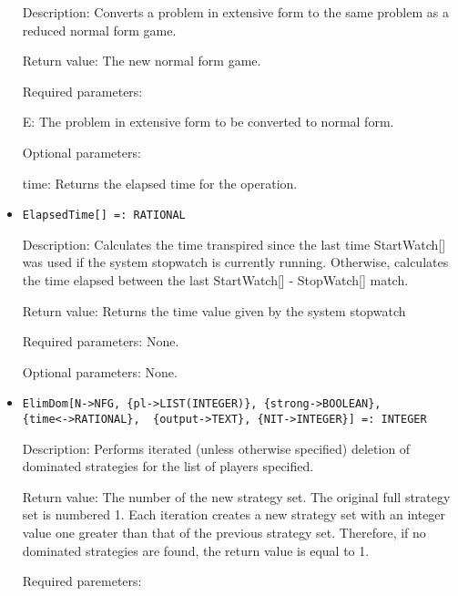 \begin{itemize}
\bd
\item
[Description:] Converts a problem in extensive form to the same
problem as a reduced normal form game.
\item
[Return value:] The new normal form game.
\item
[Required parameters:]\hfil\null
	
\bd
\item
[E:] The problem in extensive form to be converted to normal form.
\ed

\item
[Optional parameters:]\hfil\null
	
\bd
\item
[time:] Returns the elapsed time for the operation.
\ed
\ed

\item

\protect \large \begin{verbatim}
ElapsedTime[] =: RATIONAL
\end{verbatim}\normalsize

\bd
\item
[Description:] Calculates the time transpired since the last time
StartWatch[] was used if the system stopwatch is currently running.
Otherwise, calculates the time elapsed between the last StartWatch[] -
StopWatch[] match.
\item
[Return value:] Returns the time value given by the system stopwatch
\item
[Required parameters:] None.
\item   
[Optional parameters:] None.
\ed

\item
\protect \large \begin{verbatim}
ElimDom[N->NFG, {pl->LIST(INTEGER)}, {strong->BOOLEAN},
{time<->RATIONAL}, 	{output->TEXT}, {NIT->INTEGER}] =: INTEGER
\end{verbatim}
\normalsize

\bd
\item
[Description:] Performs iterated (unless otherwise specified) deletion
of dominated strategies for the list of players specified.
\item  
[Return value:] The number of the new strategy set.  The original full
strategy set is numbered 1.  Each iteration creates a new strategy set
with an integer value one greater than that of the previous strategy
set.  Therefore, if no dominated strategies are found, the return
value is equal to 1.
\item
[Required paremeters:]\hfil\null
	

\end{itemize}

